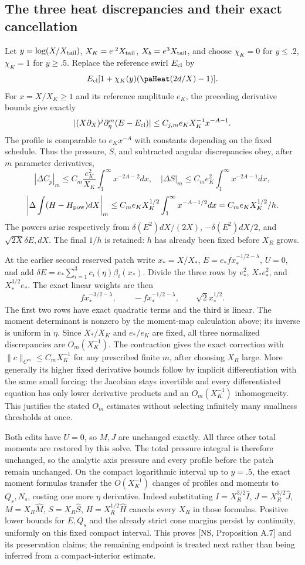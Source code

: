 \documentclass[10pt,a4paper]{article}
\begin{document}
\subsection{The three heat discrepancies and their exact cancellation}
Let $y=\log(X/X_{\rm tail})$, $X_K=e^{.2}X_{\rm tail}$,
$X_b=e^3X_{\rm tail}$, and choose $\chi_K=0$ for $y\le.2$, $\chi_K=1$
for $y\ge.5$. Replace the reference swirl $E_{\rm cl}$ by
\[
E_{\rm cl}[1+\chi_K(y)(\paHeat(2d/X)-1)].
\]
For $x=X/X_K\ge1$ and its reference amplitude $e_K$, the preceding
derivative bounds give exactly
\[
|(X\partial_X)^j\partial_\eta^m(E-E_{\rm cl})|
\le C_{j,m}e_KX_K^{-1}x^{-A-1}.
\]
The profile is comparable to $e_Kx^{-A}$ with constants depending on the
fixed schedule. Thus the pressure, $S$, and subtracted angular discrepancies
obey, after $m$ parameter derivatives,
\[
|\Delta C_p|_m\le C_m\frac{e_K^2}{X_K}\int_1^\infty x^{-2A-2}dx,
\quad |\Delta S|_m\le C_me_K^2\int_1^\infty x^{-2A-1}dx,
\]
\[
\left|\Delta\int(H-H_{\rm pow})dX\right|_m
\le C_me_KX_K^{1/2}\int_1^\infty x^{-A-1/2}dx
=C_m e_KX_K^{1/2}/h.
\]
The powers arise respectively from $\delta(E^2)dX/(2X)$,
$-\delta(E^2)dX/2$, and $\sqrt{2X}\delta E,dX$.
The final $1/h$ is retained: $h$ has already been fixed before $X_R$ grows.

At the earlier second reserved patch write $x_*=X/X_*$,
$E=e_*f x_*^{-1/2-\lambda}$, $U=0$, and add
$\delta E=e_*\sum_{i=1}^3 c_i(\eta)\beta_i(x_*)$.
Divide the three rows by $e_*^2$, $X_*e_*^2$, and $X_*^{3/2}e_*$.
The exact linear weights are then
\[
f x_*^{-3/2-\lambda},\qquad -f x_*^{-1/2-\lambda},\qquad
\sqrt2 x_*^{1/2}.
\]
The first two rows have exact quadratic terms and the third is linear.
The moment determinant is nonzero by the moment-map calculation above; its inverse is uniform in
$\eta$. Since $X_*/X_K$ and $e_*/e_K$ are fixed, all three normalized
discrepancies are $O_m(X_K^{-1})$. The contraction gives the exact correction
with $\|c\|_{C^m}\le C_mX_K^{-1}$ for any prescribed finite $m$, after
choosing $X_R$ large. More generally its higher fixed derivative bounds follow
by implicit differentiation with the same small forcing: the Jacobian stays
invertible and every differentiated equation has only lower derivative products
and an $O_m(X_K^{-1})$ inhomogeneity. This justifies the stated $O_m$ estimates
without selecting infinitely many smallness thresholds at once.

Both edits have $U=0$, so $M,J$ are unchanged exactly. All three other total
moments are restored by this solve. The total pressure integral is therefore
unchanged, so the analytic axis pressure and every profile before the patch
remain unchanged. On the compact logarithmic interval up to $y=.5$,
the exact moment formulas transfer the $O(X_K^{-1})$ changes of profiles and
moments to $Q_s,N_s$, costing one more $\eta$ derivative.
Indeed substituting $I=X_R^{3/2}\widehat I$, $J=X_R^{3/2}\widehat J$,
$M=X_R\widehat M$, $S=X_R\widehat S$, $H=X_R^{1/2}\widehat H$
cancels every $X_R$ in those formulas. Positive lower bounds for $E,Q_s$
and the already strict cone margins persist by continuity, uniformly on this
fixed compact interval. This proves [NS, Proposition A.7] and its preservation
claims; the remaining endpoint is treated next rather than being inferred
from a compact-interior estimate.
\end{document}

